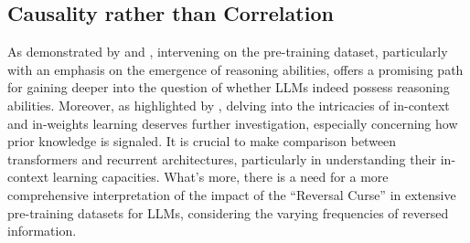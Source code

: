 \documentclass[11pt,a4paper]{article}
\begin{document}
\subsection{Causality rather than Correlation}
As demonstrated by \citet{Razeghi2022ImpactOP} and \citet{Power2022GrokkingGB}, intervening on the pre-training dataset, particularly with an emphasis on the emergence of reasoning abilities, offers a promising path for gaining deeper into the question of %
whether LLMs indeed possess reasoning abilities. Moreover, as highlighted by \citet{Chan2022DataDP}, delving into the intricacies of in-context and in-weights learning deserves further investigation, especially concerning how prior knowledge is signaled. It is crucial to make comparison between transformers and recurrent architectures, particularly in understanding their in-context learning capacities. What's more, there is a need for a more comprehensive interpretation of the impact of the ``Reversal Curse'' in extensive pre-training datasets for LLMs, considering the varying frequencies of reversed information.



\end{document}
